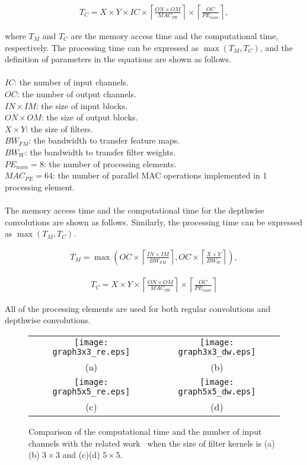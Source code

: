 \documentclass[runningheads]{llncs}
\begin{document}
\begin{align}
  T_{C} = 
  X \times Y \times IC \times \left \lceil \frac{ON \times OM}{MAC_{PE}}  \right \rceil \times 
  \left \lceil \frac{OC}{PE_{num}} \right \rceil ,
\end{align}

where $T_{M}$ and $T_{C}$ are the memory access time and the computational time, respectively. The processing time can be expressed as $\max(T_{M}, T_{C})$, and the definition of parameters in the equations are shown as follows.\\
\\
$IC$: the number of input channels.\\
$OC$: the number of output channels.\\
$IN \times IM$: the size of input blocks.\\
$ON \times OM$: the size of output blocks.\\
$X \times Y$: the size of filters.\\
$BW_{FM}$: the bandwidth to transfer feature maps.\\
$BW_{W}$: the bandwidth to transfer filter weights.\\
$PE_{num} = 8$: the number of processing elements.\\
$MAC_{PE} = 64$: the number of parallel MAC operations implemented in 1 processing element.\\
\\
The memory access time and the computational time for the depthwise convolutions are shown as follows. Similarly, the processing time can be expressed as $\max(T_{M}, T_{C})$. 

\begin{align}
  T_{M} = \max \left ( 
  OC \times \left \lceil \frac{IN \times IM }{BW_{FM}} \right \rceil, 
  OC \times \left \lceil \frac{X \times Y}{BW_{W}} \right \rceil 
  \right ),  
\end{align}

\begin{align}
  T_{C} = 
  X \times Y \times \left \lceil \frac{ON \times OM}{MAC_{PE}}  \right \rceil \times 
  \left \lceil \frac{OC}{PE_{num}} \right \rceil 
\end{align}

All of the processing elements are used for both regular convolutions and depthwise convolutions.

\begin{figure}
\begin{tabular}{cc}
\centering
\texttt{[image: graph3x3\_re.eps]} & \texttt{[image: graph3x3\_dw.eps]}\\
(a) & (b)\\
\texttt{[image: graph5x5\_re.eps]} & \texttt{[image: graph5x5\_dw.eps]}\\
(c) & (d)\\
\end{tabular}
\caption{Comparison of the computational time and the number of input channels with the related work~\cite{Yu20} when the size of filter kernels is (a)(b) $3 \times 3$ and (c)(d) $5 \times 5$.}
\label{fig:comparison}
\end{figure}
\end{document}
